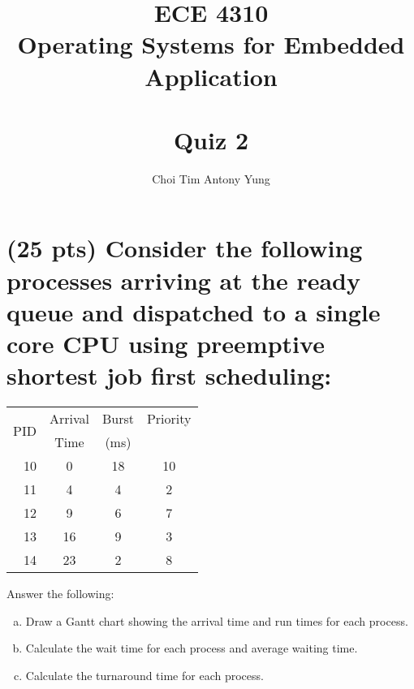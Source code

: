 \documentclass{article}
\title{ECE 4310\\Operating Systems for Embedded Application\\\,\\Quiz 2}
\author{Choi Tim Antony Yung}
\begin{document}
\maketitle

\thispagestyle{empty}
\setcounter{page}{0}

\newpage




\section{(25 pts) Consider the following processes arriving at the ready queue and dispatched to a single core CPU using preemptive shortest job first scheduling:}

\begin{table}[H]
  \centering
  \begin{tabular}{r|ccc}
    \toprule
    \multirow{2}{*}{PID} & Arrival & Burst & Priority\\
                         & Time    & (ms)  &\\
    \midrule
    10                   & 0       & 18    &10\\
    11                   & 4       & 4    &2\\
    12                   & 9       & 6    &7\\
    13                   & 16      & 9    &3\\
    14                   & 23      & 2    &8\\
    \bottomrule
  \end{tabular}
\end{table}

Answer the following:\\
\begin{enumerate}[(a)]
  \item Draw a Gantt chart showing the arrival time and run times for each process.
  \item Calculate the wait time for each process and average waiting time.
  \item Calculate the turnaround time for each process.
\end{enumerate}
\end{document}
